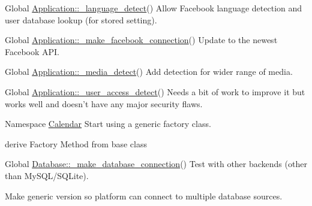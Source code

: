 \label{todo__todo000005}
\hypertarget{todo__todo000005}{}
 
\begin{DoxyDescription}
\item[Global \hyperlink{classApplication_a50272fd88e89d4f34d5b23e4b630ddfe}{Application::\_\-language\_\-detect}() ]Allow Facebook language detection and user database lookup (for stored setting). 
\end{DoxyDescription}

\label{todo__todo000002}
\hypertarget{todo__todo000002}{}
 
\begin{DoxyDescription}
\item[Global \hyperlink{classApplication_ab2e18c82d6909c852402b07aa48340bc}{Application::\_\-make\_\-facebook\_\-connection}() ]Update to the newest Facebook API. 
\end{DoxyDescription}

\label{todo__todo000004}
\hypertarget{todo__todo000004}{}
 
\begin{DoxyDescription}
\item[Global \hyperlink{classApplication_a460579297e7ecc04cb6896ed1a9b4c70}{Application::\_\-media\_\-detect}() ]Add detection for wider range of media. 
\end{DoxyDescription}

\label{todo__todo000003}
\hypertarget{todo__todo000003}{}
 
\begin{DoxyDescription}
\item[Global \hyperlink{classApplication_a8dd8f2b40e326f70b9f413d76e0eafac}{Application::\_\-user\_\-access\_\-detect}() ]Needs a bit of work to improve it but works well and doesn't have any major security flaws. 
\end{DoxyDescription}

\label{todo__todo000006}
\hypertarget{todo__todo000006}{}
 
\begin{DoxyDescription}
\item[Namespace \hyperlink{namespaceCalendar}{Calendar} ]Start using a generic factory class. 

derive Factory Method from base class 
\end{DoxyDescription}

\label{todo__todo000007}
\hypertarget{todo__todo000007}{}
 
\begin{DoxyDescription}
\item[Global \hyperlink{classDatabase_a16870e7c667f514a099afacc1009252b}{Database::\_\-make\_\-database\_\-connection}() ]Test with other backends (other than MySQL/SQLite). 

Make generic version so platform can connect to multiple database sources. 
\end{DoxyDescription}

